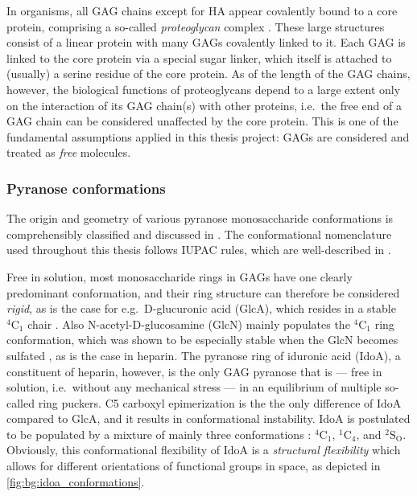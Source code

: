 In organisms, all GAG chains except for HA  appear covalently bound to a core
protein, comprising a so-called \textit{proteoglycan} complex
\cite{essentials_glycobiology_gags_chapter_2009}. These large structures consist
of a linear protein with many GAGs covalently linked to it. Each GAG is linked
to the core protein via a special sugar linker, which itself is attached to
(usually) a serine residue of the core protein. As of the length of the GAG
chains, however, the biological functions of proteoglycans depend to a large
extent only on the interaction of its GAG chain(s) with other proteins, i.e.\
the free end of a GAG chain can be considered unaffected by the core protein.
This is one of the fundamental assumptions applied in this thesis project: GAGs
are considered and treated as \textit{free} molecules.




\subsubsection{Pyranose conformations}
\label{background:gags:conformations}

The origin and geometry of various pyranose monosaccharide conformations is
comprehensibly classified and discussed in
\cite{classification_pyranose_conformers_1960}. The conformational nomenclature
used throughout this thesis follows IUPAC rules, which are well-described in
\cite{iupac_gag_conformations_1980}.

Free in solution, most monosaccharide rings in GAGs have one clearly predominant
conformation, and their ring structure can therefore be considered
\textit{rigid}, as is the case for e.g.\ D-glucuronic acid (GlcA), which resides
in a stable ${}^{4}\mathrm{C}_1$ chair \cite{almond_jacs_2010}. Also
N-acetyl-D-glucosamine (GlcN) mainly populates the ${}^{4}\mathrm{C}_1$ ring
conformation, which was shown to be especially stable when the GlcN becomes
sulfated \cite{Sattelle_glcnac_right_chair_2011}, as is the case in heparin. The
pyranose ring of iduronic acid (IdoA), a constituent of heparin, however, is the
only GAG pyranose that is --- free in solution, i.e.\ without any mechanical
stress --- in an equilibrium of multiple so-called ring puckers. C5 carboxyl
epimerization is the the only difference of IdoA compared to GlcA, and it
results in conformational instability. IdoA is postulated to be populated by a
mixture of mainly three conformations \cite{almond_jacs_2010}:
${}^{4}\mathrm{C}_1$, ${}^{1}\mathrm{C}_4$, and ${}^{2}\mathrm{S}_\mathrm{O}$.
Obviously, this conformational flexibility of IdoA is a \textit{structural
flexibility} which allows for different orientations of functional groups in
space, as depicted in \cref{fig:bg:idoa_conformations}.

